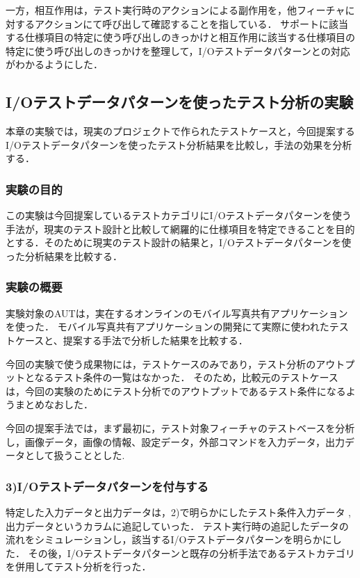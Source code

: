 \documentclass[10pt,a4j]{jarticle}
\begin{document}
一方，相互作用は，テスト実行時のアクションによる副作用を，他フィーチャに対するアクションにて呼び出して確認することを指している．
サポートに該当する仕様項目の特定に使う呼び出しのきっかけと相互作用に該当する仕様項目の特定に使う呼び出しのきっかけを整理して，I/Oテストデータパターンとの対応がわかるようにした．


\subsection{I/Oテストデータパターンを使ったテスト分析の実験} \label{sec:4-2}
本章の実験では，現実のプロジェクトで作られたテストケースと，今回提案するI/Oテストデータパターンを使ったテスト分析結果を比較し，手法の効果を分析する．
\subsubsection{実験の目的} \label{sec:4-2-1}
この実験は今回提案しているテストカテゴリにI/Oテストデータパターンを使う手法が，現実のテスト設計と比較して網羅的に仕様項目を特定できることを目的とする．そのために現実のテスト設計の結果と，I/Oテストデータパターンを使った分析結果を比較する．

\subsubsection{実験の概要} \label{sec:4-2-3}

実験対象のAUTは，実在するオンラインのモバイル写真共有アプリケーションを使った．
モバイル写真共有アプリケーションの開発にて実際に使われたテストケースと、提案する手法で分析した結果を比較する．

今回の実験で使う成果物には，テストケースのみであり，テスト分析のアウトプットとなるテスト条件の一覧はなかった．
そのため，比較元のテストケースは，今回の実験のためにテスト分析でのアウトプットであるテスト条件になるようまとめなおした．

今回の提案手法では，まず最初に，テスト対象フィーチャのテストベースを分析し，画像データ，画像の情報、設定データ，外部コマンドを入力データ，出力データとして扱うこととした.
\subsubsection{3)I/Oテストデータパターンを付与する}
特定した入力データと出力データは，2)で明らかにしたテスト条件入力データ ,出力データというカラムに追記していった．
テスト実行時の追記したデータの流れをシミュレーションし，該当するI/Oテストデータパターンを明らかにした．
その後，I/Oテストデータパターンと既存の分析手法であるテストカテゴリを併用してテスト分析を行った．
\end{document}
